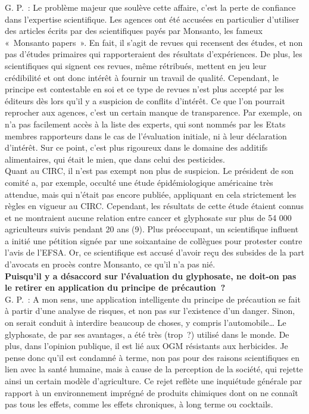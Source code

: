 \documentclass[8pt]{article}
\begin{document}
G. P.~: Le problème majeur que soulève cette affaire, c’est la perte de confiance dans l’expertise scientifique. Les agences ont été accusées en particulier d’utiliser des articles écrits par des scientifiques payés par Monsanto, les fameux «~Monsanto papers~». En fait, il s’agit de revues qui recensent des études, et non pas d’études primaires qui rapporteraient des résultats d’expériences. De plus, les scientifiques qui signent ces revues, même rétribués, mettent en jeu leur crédibilité et ont donc intérêt à fournir un travail de qualité. Cependant, le principe est contestable en soi et ce type de revues n’est plus accepté par les éditeurs dès lors qu’il y a suspicion de conflits d’intérêt. Ce que l’on pourrait reprocher aux agences, c’est un certain manque de transparence. Par exemple, on n’a pas facilement accès à la liste des experts, qui sont nommés par les Etats membres rapporteurs dans le cas de l’évaluation initiale, ni à leur déclaration d’intérêt. Sur ce point, c’est plus rigoureux dans le domaine des additifs alimentaires, qui était le mien, que dans celui des pesticides.\\

Quant au CIRC, il n’est pas exempt non plus de suspicion. Le président de son comité a, par exemple, occulté une étude épidémiologique américaine très attendue, mais qui n’était pas encore publiée, appliquant en cela strictement les règles en vigueur au CIRC. Cependant, les résultats de cette étude étaient connus et ne montraient aucune relation entre cancer et glyphosate sur plus de 54 000 agriculteurs suivis pendant 20 ans (9). Plus préoccupant, un scientifique influent a initié une pétition signée par une soixantaine de collègues pour protester contre l’avis de l’EFSA. Or, ce scientifique est accusé d’avoir reçu des subsides de la part d’avocats en procès contre Monsanto, ce qu’il n’a pas nié.\\

\textbf{Puisqu’il y a désaccord sur l’évaluation du glyphosate, ne doit-on pas le retirer en application du principe de précaution~?}\\

G. P.~: A mon sens, une application intelligente du principe de précaution se fait à partir d’une analyse de risques, et non pas sur l’existence d’un danger. Sinon, on serait conduit à interdire beaucoup de choses, y compris l’automobile… Le glyphosate, de par ses avantages, a été très (trop~?) utilisé dans le monde. De plus, dans l’opinion publique, il est lié aux OGM résistants aux herbicides. Je pense donc qu’il est condamné à terme, non pas pour des raisons scientifiques en lien avec la santé humaine, mais à cause de la perception de la société, qui rejette ainsi un certain modèle d’agriculture. Ce rejet reflète une inquiétude générale par rapport à un environnement imprégné de produits chimiques dont on ne connaît pas tous les effets, comme les effets chroniques, à long terme ou cocktails.\\
\end{document}
